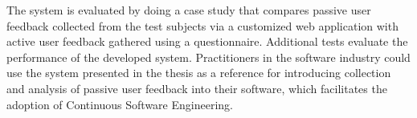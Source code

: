 The system is evaluated by doing a case study that compares passive user feedback collected from the test subjects via a customized web application with active user feedback gathered using a questionnaire.
Additional tests evaluate the performance of the developed system.
Practitioners in the software industry could use the system presented in the thesis as a reference for introducing collection and analysis of passive user feedback into their software, which facilitates the adoption of Continuous Software Engineering.
